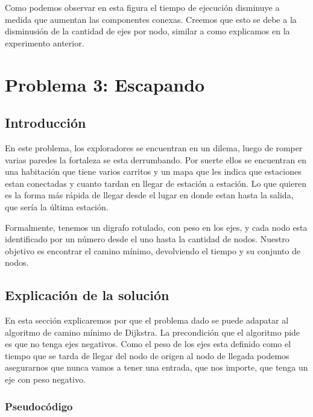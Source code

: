 \documentclass[spanish,12pt]{article}
\begin{document}
Como podemos observar en esta figura el tiempo de ejecución disminuye a medida que aumentan las componentes conexas. Creemos que esto se debe a la disminusión de la cantidad de ejes por nodo, similar a como explicamos en la experimento anterior.






\section{Problema 3: Escapando}

\subsection{Introducción}

En este problema, los exploradores se encuentran en un dilema, luego de romper varias paredes la fortaleza se esta derrumbando. Por suerte ellos se encuentran en una habitación que tiene varios carritos y un mapa que les indica que estaciones estan conectadas y cuanto tardan en llegar de estación a estación. Lo que quieren es la forma más rápida de llegar desde el lugar en donde estan hasta la salida, que sería la última estación.

Formalmente, tenemos un digrafo rotulado, con peso en los ejes, y cada nodo esta identificado por un número desde el uno hasta la cantidad de nodos. Nuestro objetivo es encontrar el camino mínimo, devolviendo el tiempo y su conjunto de nodos.


\subsection{Explicación de la solución}

   En esta sección explicaremos por que el problema dado se puede adapatar al algoritmo de camino mínimo de Dijkstra.
 La precondición que el algoritmo pide es que no tenga ejes negativos. Como el peso de los ejes esta definido como el tiempo que se tarda de llegar del nodo de origen al nodo de llegada podemos asegurarnos que nunca vamos a tener una entrada, que nos importe, que tenga un eje con peso negativo.

\subsubsection{Pseudocódigo}
\end{document}
